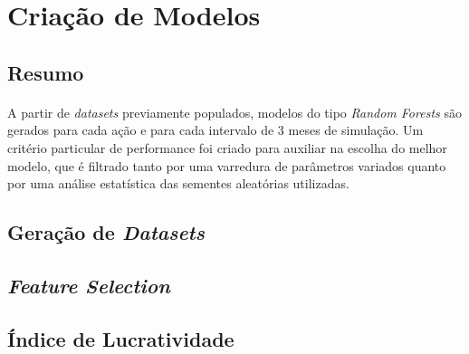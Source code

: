 


\section{Criação de Modelos}

\subsection{Resumo}

\paragraph{} A partir de \textit{datasets} previamente populados, modelos do tipo \textit{Random Forests} são gerados para cada ação e para cada intervalo de 3 meses de simulação. Um critério particular de performance foi criado para auxiliar na escolha do melhor modelo, que é filtrado tanto por uma varredura de parâmetros variados quanto por uma análise estatística das sementes aleatórias utilizadas.


\subsection{Geração de \textit{Datasets}}
\paragraph{}



\subsection{\textit{Feature Selection}}
\paragraph{}



\subsection{Índice de Lucratividade}
\paragraph{}



